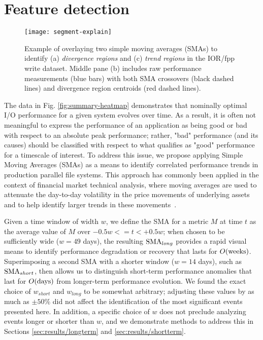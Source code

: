 \section{Feature detection}  \label{sec:features}

\begin{figure}[t]
    \centering
    \texttt{[image: segment-explain]}
    \vspace{-.35in}
    \caption{Example of overlaying two simple moving averages (SMAs) to identify (a) \emph{divergence regions} and (c) \emph{trend regions} in the \edison \scratchtwo IOR/fpp write dataset.  Middle pane (b) includes raw performance measurements (blue bars) with both SMA crossovers (black dashed lines) and divergence region centroids (red dashed lines).}
    \label{fig:segment-explain}
\end{figure}

The data in Fig. \ref{fig:summary-heatmap} demonstrates that nominally optimal I/O performance for a given system evolves over time.
As a result, it is often not meaningful to express the performance of an application as being good or bad with respect to an absolute peak performance;
rather, "bad" performance (and its causes) should be classified with respect to what qualifies as "good" performance for a timescale of interest.
To address this issue, we propose applying Simple Moving Averages (SMAs) as a means to identify correlated performance trends in production parallel file systems.
This approach has commonly been applied in the context of financial market technical analysis, where moving averages are used to attenuate the day-to-day volatility in the price movements of underlying assets and to help identify larger trends in these movements~\cite{james1968monthly,gunasekarage2001profitability}.

Given a time window of width $w$, we define the SMA for a metric $M$ at time $t$ as the average value of $M$ over ${-0.5w <= t < +0.5w}$;
when chosen to be sufficiently wide ($w = 49$ days), the resulting $\textup{SMA}_{long}$ provides a rapid visual means to identify performance degradation or recovery that lasts for $O(\textup{weeks})$.
Superimposing a second SMA with a shorter window ($w = 14$ days), such as $\textup{SMA}_{short}$, then allows us to distinguish short-term performance anomalies that last for $O(\textup{days})$ from longer-term performance evolution.
We found the exact choice of $w_{short}$ and $w_{long}$ to be somewhat arbitrary; adjusting these values by as much as $\pm 50\%$ did not affect the identification of the most significant events presented here.
In addition, a specific choice of $w$ does not preclude analyzing events longer or shorter than $w$, and we demonstrate methods to address this in Sections \ref{sec:results/longterm} and \ref{sec:results/shortterm}.


